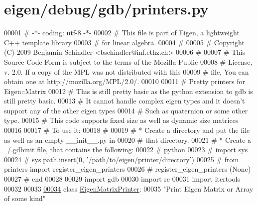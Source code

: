 \hypertarget{eigen_2debug_2gdb_2printers_8py_source}{}\section{eigen/debug/gdb/printers.py}
\label{eigen_2debug_2gdb_2printers_8py_source}

\begin{DoxyCode}
00001 \textcolor{comment}{# -*- coding: utf-8 -*-}
00002 \textcolor{comment}{# This file is part of Eigen, a lightweight C++ template library}
00003 \textcolor{comment}{# for linear algebra.}
00004 \textcolor{comment}{#}
00005 \textcolor{comment}{# Copyright (C) 2009 Benjamin Schindler <bschindler@inf.ethz.ch>}
00006 \textcolor{comment}{#}
00007 \textcolor{comment}{# This Source Code Form is subject to the terms of the Mozilla Public}
00008 \textcolor{comment}{# License, v. 2.0. If a copy of the MPL was not distributed with this}
00009 \textcolor{comment}{# file, You can obtain one at http://mozilla.org/MPL/2.0/.}
00010 
00011 \textcolor{comment}{# Pretty printers for Eigen::Matrix}
00012 \textcolor{comment}{# This is still pretty basic as the python extension to gdb is still pretty basic. }
00013 \textcolor{comment}{# It cannot handle complex eigen types and it doesn't support any of the other eigen types}
00014 \textcolor{comment}{# Such as quaternion or some other type. }
00015 \textcolor{comment}{# This code supports fixed size as well as dynamic size matrices}
00016 
00017 \textcolor{comment}{# To use it:}
00018 \textcolor{comment}{#}
00019 \textcolor{comment}{# * Create a directory and put the file as well as an empty \_\_init\_\_.py in }
00020 \textcolor{comment}{#   that directory.}
00021 \textcolor{comment}{# * Create a ~/.gdbinit file, that contains the following:}
00022 \textcolor{comment}{#      python}
00023 \textcolor{comment}{#      import sys}
00024 \textcolor{comment}{#      sys.path.insert(0, '/path/to/eigen/printer/directory')}
00025 \textcolor{comment}{#      from printers import register\_eigen\_printers}
00026 \textcolor{comment}{#      register\_eigen\_printers (None)}
00027 \textcolor{comment}{#      end}
00028 
00029 \textcolor{keyword}{import} gdb
00030 \textcolor{keyword}{import} re
00031 \textcolor{keyword}{import} itertools
00032 
00033 
\hyperlink{classgdb_1_1printers_1_1_eigen_matrix_printer}{00034} \textcolor{keyword}{class }\hyperlink{classgdb_1_1printers_1_1_eigen_matrix_printer}{EigenMatrixPrinter}:
00035     \textcolor{stringliteral}{"Print Eigen Matrix or Array of some kind"}

\end{DoxyCode}
